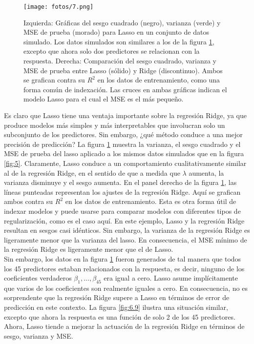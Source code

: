 \begin{figure}[h]
\centering
\texttt{[image: fotos/7.png]}
\caption{Izquierda: Gráficas del sesgo cuadrado (negro), varianza (verde) y MSE de prueba (morado) para Lasso en un conjunto de datos simulado. Los datos simulados son similares a los de la figura \ref{fig:6.8}, excepto que ahora solo dos predictores se relacionan con la respuesta. Derecha: Comparación del sesgo cuadrado, varianza y MSE de prueba entre Lasso (sólido) y Ridge (discontinuo). Ambos se grafican contra su $R^2$ en los datos de entrenamiento, como una forma común de indexación. Las cruces en ambas gráficas indican el modelo Lasso para el cual el MSE es el más pequeño.}
\label{fig:6.8}
\end{figure}

Es claro que Lasso tiene una ventaja importante sobre la regresión Ridge, ya que produce modelos más simples y más interpretables que involucran solo un subconjunto de los predictores. Sin embargo, ¿qué método conduce a una mejor precisión de predicción? La figura \ref{fig:6.8} muestra la varianza, el sesgo cuadrado y el MSE de prueba del lasso aplicado a los mismos datos simulados que en la figura \ref{fig:5}. Claramente, Lasso conduce a un comportamiento cualitativamente similar al de la regresión Ridge, en el sentido de que a medida que $\lambda$ aumenta, la varianza disminuye y el sesgo aumenta. En el panel derecho de la figura \ref{fig:6.8}, las líneas punteadas representan los ajustes de la regresión Ridge. Aquí se grafican ambos contra su $R^2$ en los datos de entrenamiento. Esta es otra forma útil de indexar modelos y puede usarse para comparar modelos con diferentes tipos de regularización, como es el caso aquí. En este ejemplo, Lasso y la regresión Ridge resultan en sesgos casi idénticos. Sin embargo, la varianza de la regresión Ridge es ligeramente menor que la varianza del lasso. En consecuencia, el MSE mínimo de la regresión Ridge es ligeramente menor que el de Lasso. \\

Sin embargo, los datos en la figura \ref{fig:6.8} fueron generados de tal manera que todos los 45 predictores estaban relacionados con la respuesta, es decir, ninguno de los coeficientes verdaderos $\beta_1, \ldots, \beta_{45}$ era igual a cero. Lasso asume implícitamente que varios de los coeficientes son realmente iguales a cero. En consecuencia, no es sorprendente que la regresión Ridge supere a Lasso en términos de error de predicción en este contexto. La figura \ref{fig:6.9} ilustra una situación similar, excepto que ahora la respuesta es una función de solo 2 de los 45 predictores. Ahora, Lasso tiende a mejorar la actuación de la regresión Ridge en términos de sesgo, varianza y MSE. \\

